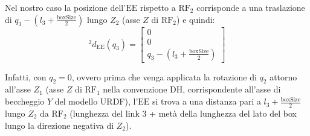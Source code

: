 \documentclass[11pt, a4paper]{report}
\begin{document}
Nel nostro caso la posizione dell'$\text{EE}$ rispetto a $\text{RF}_2$ corrisponde a una traslazione di $q_3 - \left(l_3 + \frac{\text{boxSize}}{2}\right)$ lungo $Z_{2}$ (asse $Z$ di $\text{RF}_2$) e quindi:
\[
{}^{2}d_{\text{EE}}(q_3) = \begin{bmatrix} 0 \\ 0 \\ q_3 - \left(l_3 + \frac{\text{boxSize}}{2}\right) \end{bmatrix}
\]

Infatti, con $q_{2} = 0$, ovvero prima che venga applicata la rotazione di $q_{2}$ attorno all'asse $Z_{1}$ (asse $Z$ di $\text{RF}_1$ nella convenzione DH, corrispondente all'asse di beccheggio $Y$ del modello URDF), l'$\text{EE}$ si trova a una distanza pari a $l_3 + \frac{\text{boxSize}}{2}$ lungo $Z_{2}$ da $\text{RF}_2$ (lunghezza del link 3 + metà della lunghezza del lato del box lungo la direzione negativa di $Z_{2}$).
\end{document}
